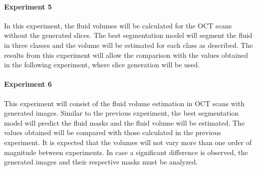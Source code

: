 \paragraph{Experiment 5}
In this experiment, the fluid volumes will be calculated for the OCT scans without the generated slices. The best segmentation model will segment the fluid in three classes and the volume will be estimated for each class as described. The results from this experiment will allow the comparison with the values obtained in the following experiment, where slice generation will be used.

\paragraph{Experiment 6}
This experiment will consist of the fluid volume estimation in OCT scans with generated images. Similar to the previous experiment, the best segmentation model will predict the fluid masks and the fluid volume will be estimated. The values obtained will be compared with those calculated in the previous experiment. It is expected that the volumes will not vary more than one order of magnitude between experiments. In case a significant difference is observed, the generated images and their respective masks must be analyzed.